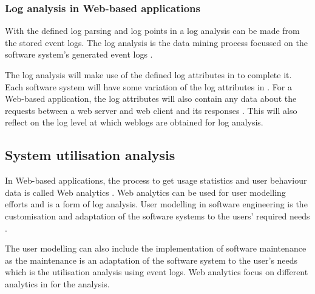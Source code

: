 \subsubsection{Log analysis in Web-based applications}
With the defined log parsing and log points in  a log analysis can be made from the stored event logs. The log analysis is the data mining process focussed on the software system's generated event logs \cite{Slaninova2014}.\par The log analysis will make use of the defined log attributes in  to complete it. Each software system will have some variation of the log attributes in . For a Web-based application, the log attributes will also contain any data about the requests between a web server and web client and its responses \cite{Slaninova2014, Dhanalakshmi2016}. This will also reflect on the log level at which weblogs are obtained for log analysis.


\subsection{System utilisation analysis}\label{sec:ch1_systemUtilisation}
In Web-based applications, the process to get usage statistics and user behaviour data is called Web analytics \cite{Kocsis2012}. Web analytics can be used for user modelling efforts and is a form of log analysis. User modelling in software engineering is the customisation and adaptation of the software systems to the users' required needs \cite{Waqar2017, Paliouras1999}.\par The user modelling can also include the implementation of software maintenance as the maintenance is an adaptation of the software system to the user's needs which is the utilisation analysis using event logs. Web analytics focus on different analytics in  for the analysis. 

